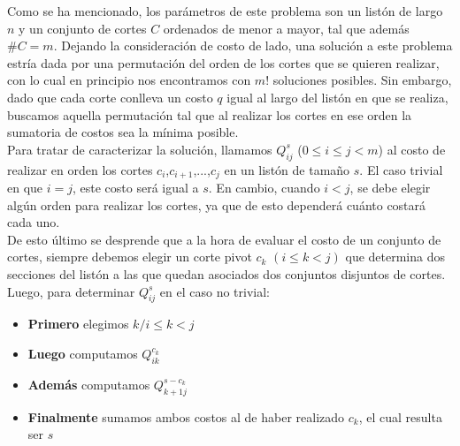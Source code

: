 Como se ha mencionado, los parámetros de este problema son un listón de largo $n$ y un conjunto de cortes $C$ ordenados de menor a mayor, tal que además $\#C = m$.  Dejando la consideración de costo de lado, una solución a este problema estría dada por una permutación del orden de los cortes que se quieren realizar, con lo cual en principio nos encontramos con $m!$ soluciones posibles. Sin embargo, dado que cada corte conlleva un costo $q$ igual al largo del listón en que se realiza, buscamos aquella permutación tal que al realizar los cortes en ese orden la sumatoria de costos sea la mínima posible.\\
\indent Para tratar de caracterizar la solución, llamamos $Q^{s}_{ij}$ ($0 \leq i \leq j < m$) al costo de realizar en orden los cortes $c_i$,$c_{i+1}$,...,$c_j$ en un listón de tamaño $s$. El caso trivial en que $i=j$, este costo será igual a $s$. En cambio, cuando $i < j$, se debe elegir algún orden para realizar los cortes, ya que de esto dependerá cuánto costará cada uno.\\
\indent De esto último se desprende que a la hora de evaluar el costo de un conjunto de cortes, siempre debemos elegir un corte pivot $c_k$ $(i \leq k < j)$ que determina dos secciones del listón a las que quedan asociados dos conjuntos disjuntos de cortes. Luego, para determinar $Q^{s}_{ij}$ en el caso no trivial:
			\begin{itemize} \itemsep -2pt
			\item \textbf{Primero} elegimos $k / i \leq k < j$
			\end{itemize}
			\begin{itemize} \itemsep -2pt
			\item \textbf{Luego} computamos $Q^{c_k}_{ik}$
			\end{itemize}
			\begin{itemize} \itemsep -2pt
			\item \textbf{Además} computamos $Q^{s-c_k}_{k+1j}$
			\end{itemize}
			\begin{itemize} \itemsep -2pt
			\item \textbf{Finalmente} sumamos ambos costos al de haber realizado $c_k$, el cual resulta ser $s$
			\end{itemize}

